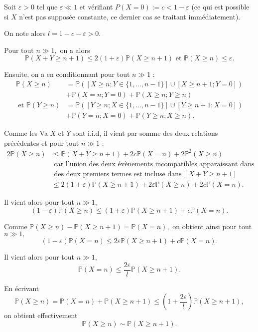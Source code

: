 Soit $\varepsilon>0$ tel que $\varepsilon\ll1$ et vérifiant $\displaystyle P(X=0):=c<1-\varepsilon$ (ce qui est possible si $X$ n'est pas supposée constante, ce dernier cas se traitant immédiatement).

On note alors $\displaystyle l=1-c-\varepsilon>0.$

Pour tout $n\gg1,$ on a alors $$\mathbb{P}(X+Y\geq n+1)\leq 2(1+\varepsilon)\mathbb{P}(X\geq n+1) \mbox{ et } \mathbb{P}(X\geq n)\leq \varepsilon.$$ 

Ensuite, on a en conditionnant pour tout $n\gg1$ :
\begin{align*}
\mathbb{P}(X\geq n) & =\mathbb{P}([X\geq n;Y\in\{1,\ldots,n-1\}]\cup[X\geq n+1;Y=0])\\
& +\mathbb{P}(X=n;Y=0)+\mathbb{P}(X\geq n;Y\geq n)\\
\mbox{ et } \mathbb{P}(Y\geq n) & =\mathbb{P}([Y\geq n;X\in\{1,\ldots,n-1\}]\cup[Y\geq n+1;X=0])\\
& +\mathbb{P}(Y=n;X=0)+\mathbb{P}(Y\geq n;X\geq n).
\end{align*}

Comme les Va $X$ et $Y$ sont i.i.d, il vient par somme des deux relations précédentes et pour tout $n\gg1$ :
\begin{align*}
2\mathbb{P}(X\geq n) & \leq \mathbb{P}(X+Y\geq n+1)+2c\mathbb{P}(X=n)+2\mathbb{P}^{2}(X\geq n)\\
& \mbox{ car l'union des deux évènements incompatibles apparaissant dans chacun }\\
& \mbox{ des deux premiers termes est incluse dans } [X+Y\geq n+1]\\ 
&\leq 2(1+\varepsilon)\mathbb{P}(X\geq n+1) +2\varepsilon \mathbb{P}(X\geq n)+2c\mathbb{P}(X=n).
\end{align*}

Il vient alors pour tout $n\gg 1,$ $$ (1-\varepsilon)\mathbb{P}(X\geq n)\leq (1+\varepsilon)\mathbb{P}(X\geq n+1)+c\mathbb{P}(X=n).$$

Comme $\displaystyle \mathbb{P}(X\geq n)-\mathbb{P}(X\geq n+1)=\mathbb{P}(X=n),$ on obtient ainsi pour tout $n\gg1,$ $$ (1-\varepsilon)\mathbb{P}(X=n)\leq 2\varepsilon\mathbb{P}(X\geq n+1)+c\mathbb{P}(X=n).$$

Il vient alors pour tout $n\gg 1,$ $$ \mathbb{P}(X=n)\leq \frac{2\varepsilon}{l}\mathbb{P}(X\geq n+1).$$

En écrivant $$\mathbb{P}(X\geq n)=\mathbb{P}(X=n)+\mathbb{P}(X\geq n+1)\leq \left(1+\frac{2\varepsilon}{l}\right)\mathbb{P}(X\geq n+1),$$ on obtient effectivement $$\mathbb{P}(X\geq n)\sim \mathbb{P}(X\geq n+1).$$

